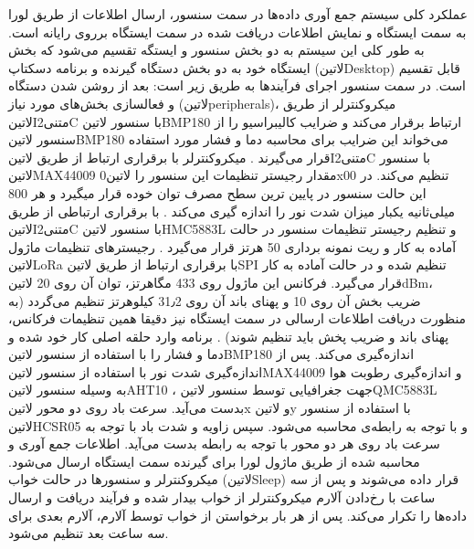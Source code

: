 عملکرد کلی سیستم جمع آوری داده‌ها در سمت سنسور، ارسال اطلاعات از طریق لورا به سمت ایستگاه و نمایش اطلاعات دریافت شده در سمت ایستگاه برروی رایانه است. به طور کلی این سیستم به دو بخش سنسور و ایستگه تقسیم می‌شود که بخش ایستگاه خود به دو بخش دستگاه گیرنده و برنامه دسکتاپ (‌لاتین{Desktop}) قابل تقسیم است. در سمت سنسور اجرای فرآیند‌ها به طریق زیر است: 
بعد از روشن شدن دستگاه و فعالسازی بخش‌های مورد نیاز (‌لاتین{peripherals})، میکروکنترلر از طریق ‌لاتین{I‌متنی{2}C} با سنسور ‌لاتین{BMP180} ارتباط برقرار می‌کند و ضرایب کالیبراسیو را از سنسور ‌لاتین{BMP180} می‌خواند این ضرایب برای محاسبه دما و فشار مورد استفاده قرار می‌گیرند .
میکروکنترلر با برقراری ارتباط از طریق ‌لاتین{I‌متنی{2}C} با سنسور ‌لاتین{MAX44009} مقدار رجیستر تنظیمات این سنسور را ‌لاتین{0x00} تنظیم می‌کند. در این حالت سنسور در پایین ترین سطح مصرف توان خوده قرار میگیرد و هر 800 میلی‌ثانیه یکبار میزان شدت نور را اندازه گیری می‌کند .
با برقراری ارتباطی از طریق ‌لاتین{I‌متنی{2}C} با سنسور ‌لاتین{HMC5883L} و تنظیم رجیستر تنظیمات سنسور در حالت آماده به کار و ریت نمونه برداری 50 هرتز قرار می‌گیرد .
رجیستر‌های تنظیمات ماژول ‌لاتین{LoRa} با برقراری ارتباط از طریق ‌لاتین{SPI} تنظیم شده و در حالت آماده به کار قرار می‌گیرد. فرکانس این ماژول روی 433 مگاهرتز، توان آن روی 20 ‌لاتین{dBm}، ضریب بخش آن روی 10 و پهنای باند آن روی 31٫2 کیلوهرتز تنظیم می‌گردد (به منظورت دریافت اطلاعات ارسالی در سمت ایستگاه نیز دقیقا همین تنظیمات فرکانس، پهنای باند و ضریب پخش باید تنظیم شوند) .
برنامه وارد حلقه اصلی کار خود شده و دما و فشار را با استفاده از سنسور ‌لاتین{BMP180} اندازه‌گیری می‌کند. 
پس از اندازه‌گیری شدت نور با استفاده از سنسور ‌لاتین{MAX44009}  و اندازه‌گیری رطوبت هوا به وسیله سنسور ‌لاتین{AHT10} ، جهت جغرافیایی توسط سنسور ‌لاتین{QMC5883L}  بدست می‌آید. 
سرعت باد روی دو محور ‌لاتین{x} و ‌لاتین{y} با استفاده از سنسور ‌لاتین{HCSR05} و با توجه به رابطه‌ی  محاسبه می‌شود. سپس زاویه و شدت باد با توجه به سرعت باد روی هر دو محور با توجه به رابطه  بدست می‌آید.
اطلاعات جمع آوری و محاسبه شده از طریق ماژول لورا برای گیرنده سمت ایستگاه ارسال می‌شود.
میکروکنترلر و سنسور‌ها در حالت خواب (‌لاتین{Sleep}) قرار داده می‌شوند و پس از سه ساعت با رخ‌دادن آلارم میکرو‌کنترلر از خواب بیدار شده و فرآیند دریافت و ارسال داده‌ها را تکرار می‌کند.
پس از هر بار برخواستن از خواب توسط آلارم، آلارم بعدی برای سه ساعت بعد تنظیم می‌شود.


